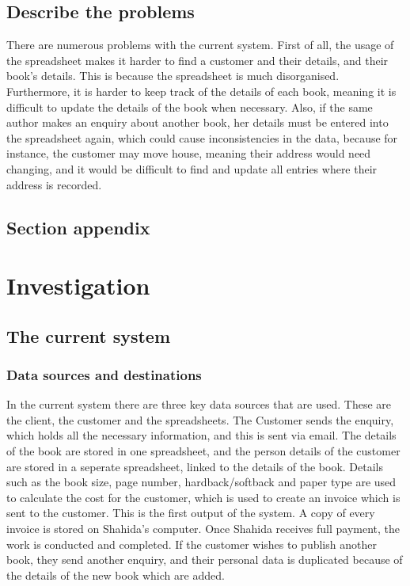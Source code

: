 \subsection{Describe the problems}
There are numerous problems with the current system. First of all, the usage of the spreadsheet makes it harder to find a customer and their details, and their book’s details. This is because the spreadsheet is much disorganised. Furthermore, it is harder to keep track of the details of each book, meaning it is difficult to update the details of the book when necessary. Also, if the same author makes an enquiry about another book, her details must be entered into the spreadsheet again, which could cause inconsistencies in the data, because for instance, the customer may move house, meaning their address would need changing, and it would be difficult to find and update all entries where their address is recorded.

\subsection{Section appendix}

\section{Investigation}

\subsection{The current system}

\subsubsection{Data sources and destinations}
In the current system there are three key data sources that are used. These are the client, the customer and the spreadsheets. The Customer sends the enquiry, which holds all the necessary information, and this is sent via email. The details of the book are stored in one spreadsheet, and the person details of the customer are stored in a seperate spreadsheet, linked to the details of the book. Details such as the book size, page number, hardback/softback and paper type are used to calculate the cost for the customer, which is used to create an invoice which is sent to the customer. This is the first output of the system. A copy of every invoice is stored on Shahida's computer. Once Shahida receives full payment, the work is conducted and completed. If the customer wishes to publish another book, they send another enquiry, and their personal data is duplicated because of the details of the new book which are added.


